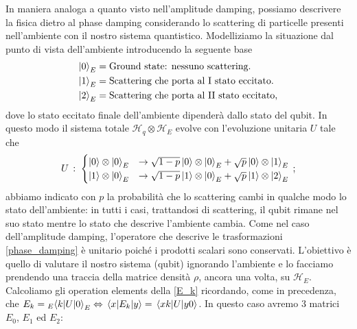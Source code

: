 \noindent In maniera analoga a quanto visto nell'amplitude damping, possiamo descrivere la fisica dietro al phase damping considerando lo scattering di particelle presenti nell'ambiente con il nostro sistema quantistico. Modelliziamo la situazione dal punto di vista dell'ambiente introducendo la seguente base
\begin{align*}
    \ket{0}_E &= \text{Ground state: nessuno scattering}. \\
    \ket{1}_E &= \text{Scattering che porta al I stato eccitato}. \\
    \ket{2}_E &= \text{Scattering che porta al II stato eccitato},
\end{align*}
dove lo stato eccitato finale dell'ambiente dipender\`a dallo stato del qubit.
In questo modo il sistema totale $\mathcal{H}_q \otimes \mathcal{H}_E$ evolve con l'evoluzione unitaria $U$ tale che
\begin{equation}\label{phase_damping}
    U \, : \; 
    \begin{cases}
        \ket{0} \otimes \ket{0}_E &\rightarrow  \sqrt{1-p} \ket{0} \otimes \ket{0}_E + \sqrt{p} \ket{0} \otimes \ket{1}_E \\
        \ket{1} \otimes \ket{0}_E &\rightarrow  \sqrt{1-p} \ket{1} \otimes \ket{0}_E + \sqrt{p} \ket{1} \otimes \ket{2}_E
    \end{cases} \, ;
\end{equation}
abbiamo indicato con $p$ la probabilità che lo scattering cambi in qualche modo lo stato dell'ambiente: in tutti i casi, trattandosi di scattering, il qubit rimane nel suo stato mentre lo stato che descrive l'ambiente cambia. Come nel caso dell'amplitude damping, l'operatore che descrive le trasformazioni \eqref{phase_damping} è unitario poiché i prodotti scalari sono conservati. L'obiettivo è quello di valutare il nostro sistema (qubit) ignorando l'ambiente e lo facciamo prendendo una traccia della matrice densità $\rho$, ancora una volta, su $\mathcal{H}_E$. Calcoliamo gli operation elements della \eqref{E_k} ricordando, come in precedenza, che $E_k = {}_E \! \mel{k}{U}{0}_E \Leftrightarrow \mel{x}{E_k}{y} = \mel{x k}{U}{y 0}$. In questo caso avremo 3 matrici $E_0$, $E_1$ ed $E_2$:
